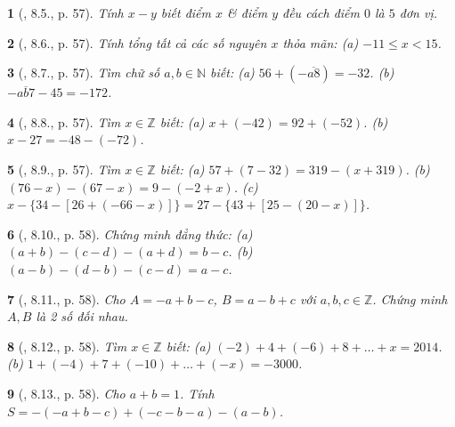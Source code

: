 \documentclass{article}
\newtheorem{baitoan}{}
\begin{document}
\begin{baitoan}[\cite{Binh_boi_duong_Toan_6_tap_1}, 8.5., p. 57]
	Tính $x - y$ biết điểm $x$ \& điểm $y$ đều cách điểm $0$ là $5$ đơn vị.
\end{baitoan}

\begin{baitoan}[\cite{Binh_boi_duong_Toan_6_tap_1}, 8.6., p. 57]
	Tính tổng tất cả các số nguyên $x$ thỏa mãn: (a) $-11\le x < 15$.
\end{baitoan}

\begin{baitoan}[\cite{Binh_boi_duong_Toan_6_tap_1}, 8.7., p. 57]
	Tìm chữ số $a,b\in\mathbb{N}$ biết: (a) $56 + (-\overline{a8}) = -32$. (b) $-\overline{ab7} - 45 = -172$.
\end{baitoan}

\begin{baitoan}[\cite{Binh_boi_duong_Toan_6_tap_1}, 8.8., p. 57]
	Tìm $x\in\mathbb{Z}$ biết: (a) $x + (-42) = 92 + (-52)$. (b) $x - 27 = -48 - (-72)$.
\end{baitoan}

\begin{baitoan}[\cite{Binh_boi_duong_Toan_6_tap_1}, 8.9., p. 57]
	Tìm $x\in\mathbb{Z}$ biết: (a) $57 + (7 - 32) = 319 - (x + 319)$. (b) $(76 - x) - (67 - x) = 9 - (-2 + x)$. (c) $x - \{34 - [26 + (-66 - x)]\} = 27 - \{43 + [25 - (20 - x)]\}$.
\end{baitoan}

\begin{baitoan}[\cite{Binh_boi_duong_Toan_6_tap_1}, 8.10., p. 58]
	Chứng minh đẳng thức: (a) $(a + b) - (c - d) - (a + d) = b - c$. (b) $(a - b) - (d - b) - (c - d) = a - c$.
\end{baitoan}

\begin{baitoan}[\cite{Binh_boi_duong_Toan_6_tap_1}, 8.11., p. 58]
	Cho $A = -a + b - c$, $B = a - b + c$ với $a,b,c\in\mathbb{Z}$. Chứng minh $A,B$ là 2 số đối nhau.
\end{baitoan}

\begin{baitoan}[\cite{Binh_boi_duong_Toan_6_tap_1}, 8.12., p. 58]
	Tìm $x\in\mathbb{Z}$ biết: (a) $(-2) + 4 + (-6) + 8 + \ldots + x = 2014$. (b) $1 + (-4) + 7 + (-10) + \ldots + (-x) = -3000$.
\end{baitoan}

\begin{baitoan}[\cite{Binh_boi_duong_Toan_6_tap_1}, 8.13., p. 58]
	Cho $a + b = 1$. Tính $S = -(-a + b - c) + (-c - b - a) - (a - b)$.
\end{baitoan}
\end{document}
